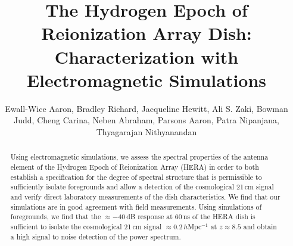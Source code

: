 \documentclass[twocolumn]{emulateapj}
\begin{document}
\title{The Hydrogen Epoch of Reionization Array Dish: Characterization with Electromagnetic Simulations}
\author{
Ewall-Wice Aaron,
Bradley Richard,
Jacqueline Hewitt,
Ali S. Zaki,
Bowman Judd,
Cheng Carina,
Neben Abraham,
Parsons Aaron,
Patra Nipanjana,
Thyagarajan Nithyanandan
}

\begin{abstract}
Using electromagnetic simulations, we assess the spectral properties of the antenna element of the Hydrogen Epoch of Reionization Array (HERA) in order to both establish a specification for the degree of spectral structure that is permissible to sufficiently isolate foregrounds and allow a detection of the cosmological 21\,cm signal and verify direct laboratory measurements of the dish characteristics. We find that our simulations are in good agreement with field measurements. Using simulations of foregrounds, we find that the $\approx -40$\,dB response at 60\,ns of the HERA dish is sufficient to isolate the cosmological 21\,cm signal $\approx 0.2$\,$h$Mpc$^{-1}$ at $z\approx 8.5$ and obtain a high signal to noise detection of the power spectrum.
\end{abstract}
\end{document}
